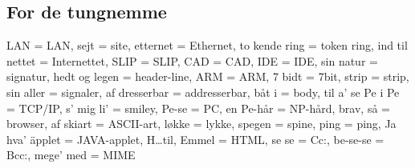 \documentclass[danish]{article}
\begin{document}
\subsection*{For de tungnemme}

LAN = LAN, sejt = site, etternet = Ethernet, to kende ring = token
ring, ind til nettet = Internettet, SLIP = SLIP, CAD = CAD, IDE = IDE, 
sin natur = signatur, hedt og legen = header-line, ARM = ARM, 7 bidt = 
7bit, strip = strip, sin aller = signaler, af dresserbar =
addresserbar, båt i = body, til a' se Pe i Pe = TCP/IP, s' mig li' =
smiley, Pe-se = PC, en Pe-hår = NP-hård, brav, så = browser, af
skiart = ASCII-art, løkke = lykke, spegen = spine, ping = ping, Ja
hva' äpplet = JAVA-applet, H\ldots til, Emmel = HTML, se se = Cc:,
be-se-se = Bcc:,  mege' med = MIME
\end{document}
